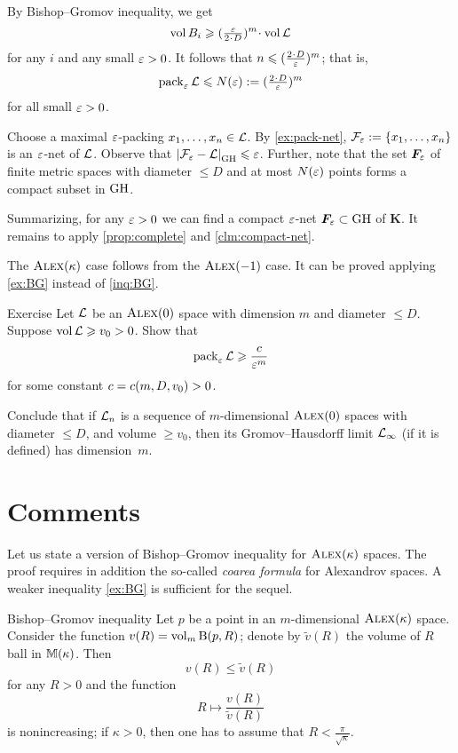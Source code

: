 By Bishop--Gromov inequality, we get 
\[\vol B_i\ge (\tfrac\eps{2\cdot D})^m\cdot\vol \spc{L}\]
for any $i$ and any small $\varepsilon>0$.
It follows that $n\le (\tfrac{2\cdot D}\eps)^m$;
that is, 
\[\pack_\eps\spc{L}\le  N(\eps)\df(\tfrac{2\cdot D}\eps)^m\]
for all small $\varepsilon>0$.

Choose a maximal $\varepsilon$-packing $x_1,\z\dots,x_n\in \spc{L}$.
By \ref{ex:pack-net}, $\spc{F}_\eps\z\df\{x_1,\z\dots,x_n\}$ is an $\varepsilon$-net of $\mathcal{L}$.
Observe that $\dist{\spc{F}_\eps}{\spc{L}}{\GH}\le \eps$.
Further, note that the set $\bm{F}_\varepsilon$ of finite metric spaces with diameter $\le D$ and at most $N(\varepsilon)$ points forms a compact subset in $\operatorname{\rm GH}\nolimits$.

Summarizing, for any $\varepsilon>0$ we can find a compact $\varepsilon$-net $\bm{F}_\varepsilon\subset \operatorname{\rm GH}\nolimits$ of $\bm{K}$.
It remains to apply \ref{prop:complete} and \ref{clm:compact-net}.

The $\textsc{Alex}(\kappa)$ case follows from the $\textsc{Alex}(-1)$ case.
It can be proved applying \ref{ex:BG} instead of \ref{inq:BG}.
\qeds

\begin{thm}{Exercise}\label{ex:pack-vol}
Let $\mathcal{L}$ be an $\textsc{Alex}(0)$ space with dimension $m$ and diameter $\le D$.
Suppose $\operatorname{\rm vol}\nolimits\mathcal{L}\geqslant v_0>0$.
Show that 
\[\operatorname{\rm pack}\nolimits_\varepsilon\mathcal{L}\geqslant \frac{c}{\varepsilon^m}\]
for some constant $c=c(m,D,v_0)>0$.

Conclude that if $\mathcal{L}_n$ is a sequence of $m$-dimensional $\textsc{Alex}(0)$ spaces with diameter $\le D$, and volume $\ge v_0$, then its Gromov--Hausdorff limit $\mathcal{L}_\infty$ (if it is defined) has dimension~$m$.%
\end{thm}

\section{Comments}

Let us state a version of Bishop--Gromov inequality for $\textsc{Alex}(\kappa)$ spaces.
The proof requires in addition the so-called \textit{coarea formula} for Alexandrov spaces. 
A weaker inequality \ref{ex:BG} is sufficient for the sequel.

\begin{thm}{Bishop--Gromov inequality}\label{inq:BG+}
Let $p$ be a point in an $m$-dimensional $\textsc{Alex}(\kappa)$ space.
Consider the function $v(R)\z=\vol_m\oBall(p,R)$;
denote by $\tilde v(R)$ the volume of $R$ ball in $\mathbb{M}(\kappa)$.
Then 
\[v(R)\le \tilde v(R)\]
for any $R>0$ and the function 
\[R\mapsto \frac{v(R)}{\tilde v(R)}\] is nonincreasing;
if $\kappa>0$, then one has to assume that $R<\tfrac\pi{\sqrt\kappa}$.
\end{thm}

